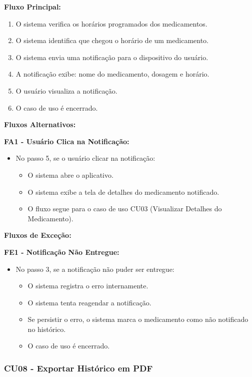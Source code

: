 \documentclass[12pt]{article}
\begin{document}
\textbf{Fluxo Principal:}
\begin{enumerate}
    \item O sistema verifica os horários programados dos medicamentos.
    \item O sistema identifica que chegou o horário de um medicamento.
    \item O sistema envia uma notificação para o dispositivo do usuário.
    \item A notificação exibe: nome do medicamento, dosagem e horário.
    \item O usuário visualiza a notificação.
    \item O caso de uso é encerrado.
\end{enumerate}

\textbf{Fluxos Alternativos:}

\textbf{FA1 - Usuário Clica na Notificação:}
\begin{itemize}
    \item No passo 5, se o usuário clicar na notificação:
    \begin{itemize}
        \item O sistema abre o aplicativo.
        \item O sistema exibe a tela de detalhes do medicamento notificado.
        \item O fluxo segue para o caso de uso CU03 (Visualizar Detalhes do Medicamento).
    \end{itemize}
\end{itemize}

\textbf{Fluxos de Exceção:}

\textbf{FE1 - Notificação Não Entregue:}
\begin{itemize}
    \item No passo 3, se a notificação não puder ser entregue:
    \begin{itemize}
        \item O sistema registra o erro internamente.
        \item O sistema tenta reagendar a notificação.
        \item Se persistir o erro, o sistema marca o medicamento como não notificado no histórico.
        \item O caso de uso é encerrado.
    \end{itemize}
\end{itemize}

\subsubsection{CU08 - Exportar Histórico em PDF}
\end{document}
